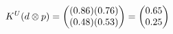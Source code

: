 \documentclass[preview]{standalone}
\begin{document}
\begin{align*}
\special{dvisvgm:raw <g id='unique000'>}K^U(d \otimes p) = \begin{pmatrix} (0.86)(0.76) \\ (0.48)(0.53) \end{pmatrix} = \begin{pmatrix} 0.65 \\ 0.25 \end{pmatrix}\special{dvisvgm:raw </g>}
\end{align*}
\end{document}
